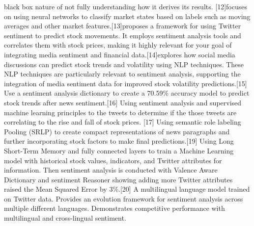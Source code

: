 black box nature of not fully understanding how it derives its results. [12]focuses on using neural networks to classify market states based on labels such as moving averages and other market features.[13]proposes a framework for using Twitter sentiment to predict stock movements. It employs sentiment analysis tools and correlates them with stock prices, making it highly relevant for your goal of integrating media sentiment and financial data.[14]explores how social media discussions can predict stock trends and volatility using NLP techniques. These NLP techniques are particularly relevant to sentiment analysis, supporting the integration of media sentiment data for improved stock volatility predictions.[15] Use a sentiment analysis dictionary to create a 70.59\% accuracy model to predict stock trends after news sentiment.[16] Using sentiment analysis and supervised machine learning principles to the tweets to determine if the those tweets are correlating to the rise and fall of stock prices. [17] Using semantic role labeling Pooling (SRLP) to create compact representations of news paragraphs and further incorporating stock factors to make final predictions.[19] Using Long Short-Term Memory and fully connected layers to train a Machine Learning model with historical stock values, indicators, and Twitter attributes for information. Then sentiment analysis is conducted with Valence Aware Dictionary and sentiment Reasoner showing adding more Twitter attributes raised the Mean Squared Error by 3\%.[20] A multilingual language model trained on Twitter data. Provides an evolution framework for sentiment analysis across multiple different languages. Demonstrates competitive performance with multilingual and cross-lingual sentiment.
